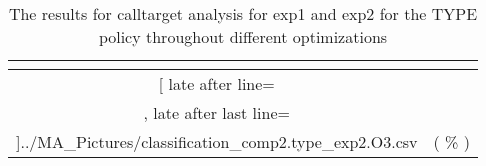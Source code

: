 \begin{table}[!htbp]
{\begin{tabular}{|c|c}
\multicolumn{1}{c}{}
	\\\midrule
	\csvreader[ late after line=\\, late after last line=\\\bottomrule]{../MA_Pictures/classification_comp2.type_exp2.O3.csv}{
}
	{\csvcolxiii ( \csvcolxiv \% ) & \csvcolxv ( \csvcolxvi \% )}%


    	\end{tabular}
}
		\caption {The results for calltarget analysis for exp1 and exp2 for the TYPE policy throughout different optimizations}
		\label{tbl:CTdestinterexp12TYPE}
\end{table}


